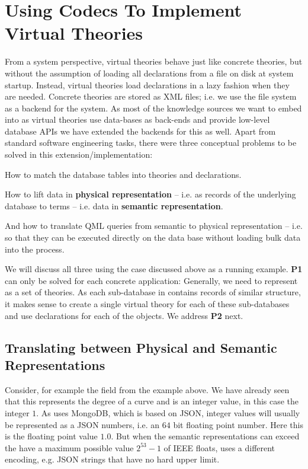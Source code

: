 \section{Using Codecs To Implement \lmfdb Virtual Theories}\label{sec:vt}

From a system perspective, virtual theories behave just like concrete theories, but
without the assumption of loading all declarations from a file on disk at system startup.
Instead, virtual theories load declarations in a lazy fashion when they are
needed. Concrete theories are stored as XML files; i.e. we use the file system as a
backend for the \mmt system. As most of the knowledge sources we want to embed into \ommt
as virtual theories use data-bases as back-ends and provide low-level database APIs we
have extended the \mmt backends for this as well. Apart from standard software engineering
tasks, there were three conceptual problems to be solved in this extension/implementation:
\begin{compactenum}[\bf P1]
\item How to match the database tables into \ommt theories and declarations. 
\item How to lift data in \textbf{physical representation} -- i.e. as records of the
  underlying database to \ommt terms -- i.e. data in \textbf{semantic representation}.
\item And how to translate QML queries from semantic to physical representation -- i.e. so
  that they can be executed directly on the data base without loading bulk data into the
  \mmt process.
\end{compactenum}
We will discuss all three using the \lmfdb case discussed above as a running
example. \textbf{P1} can only be solved for each concrete application: Generally, we need
to represent \lmfdb as a set of \ommt theories.  As each sub-database in \lmfdb contains
records of similar structure, it makes sense to create a single virtual theory for each of
these sub-databases and use \ommt declarations for each of the objects. We address
\textbf{P2} next.

\subsection{Translating between Physical and Semantic Representations}\label{sec:vt:translation}

Consider, for example the  field from the example above.  We have
already seen that this represents the degree of a curve and is an integer value, in this
case the integer $1$.  As \lmfdb uses MongoDB, which is based on JSON, integer values will
usually be represented as a JSON numbers, i.e. an  $64$ bit floating
point number.  Here this is the floating point value $1.0$. But when the semantic
representations can exceed the have a maximum possible value $2^{53}-1$ of IEEE floats,
\lmfdb uses a different encoding, e.g. JSON strings that have no hard upper limit.

